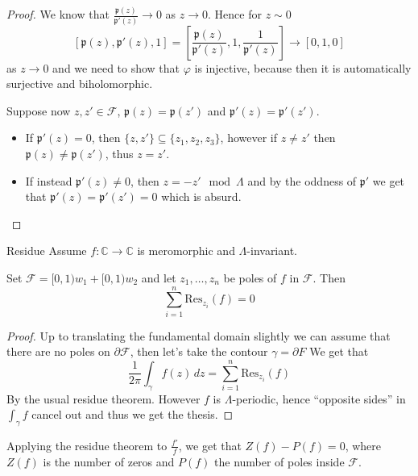 \begin{proof}{}
    We know that \(\frac{\mathfrak{p}{(z)}}{\mathfrak{p}'{(z)}} \to 0\) as \(z
    \to 0\). Hence for \(z \sim 0\) 
    \[
        \left[ \mathfrak{p}{(z)}, \mathfrak{p}'{(z)}, 1 \right] = \left[
        \frac{\mathfrak{p}{(z)}}{\mathfrak{p}'{(z)}}, 1,
    \frac{1}{\mathfrak{p}'{(z)}} \right] \to [0, 1, 0]
    \]
    as \(z \to 0\) 
    and we need to show that \(\varphi \) is injective, because then it is
    automatically surjective and biholomorphic. %

    Suppose now \(z, z' \in \mathcal{F}\), \(\mathfrak{p}{(z)} =
    \mathfrak{p}{(z')}\) and \(\mathfrak{p}'{(z)} = \mathfrak{p}'{(z')}\).
\begin{itemize}[label = --]
    \item If \(\mathfrak{p}'{(z)} = 0\), then \(\{z, z'\} \subseteq \{z_{1},
        z_{2}, z_{3}\}\), however if \(z \neq z'\) then \(\mathfrak{p}{(z)} \neq
        \mathfrak{p}{(z')}\), thus \(z = z'\).
    \item If instead \(\mathfrak{p}'{(z)} \neq 0\), then \(z = -z' \mod
        \Lambda\) and by the oddness of \(\mathfrak{p}'\) we get that
        \(\mathfrak{p}'{(z)} = \mathfrak{p}'{(z')} = 0\) which is absurd.
\end{itemize}


\end{proof}

\begin{theorem}{Residue}
    Assume \(f : \mathbb{C} \to \mathbb{C}\) is meromorphic and
    \(\Lambda\)-invariant. 

    Set \(\mathcal{F} = [0, 1)w_{1} + [0, 1)w_{2}\) and let \(z_{1}, \dots,
    z_{n}\) be poles of \(f\) in \(\mathcal{F}\). Then 
    \[
      \sum_{i=1}^{n} \mathrm{Res}_{z_{i}} {(f)} = 0
    \]
\end{theorem}

\begin{proof}{}
    Up to translating the fundamental domain slightly we can assume that there
    are no poles on \(\partial \mathcal{F}\), then let's take the contour
    \(\gamma = \partial F\) 
    We get that 
    \[
      \frac{1}{2\pi} \int_{\gamma} f{(z)}  \,dz = \sum_{i=1}^{n}
      \mathrm{Res}_{z_{i}} {(f)}  
    \]
    By the usual residue theorem. However \(f\) is \(\Lambda\)-periodic, hence
    ``opposite sides'' in \(\int _{\gamma} f\) cancel out and thus we get the
    thesis.
\end{proof}
\begin{remark}{}
    Applying the residue theorem to \(\frac{f'}{f}\), we get that \(Z{(f)} -
    P{(f)} = 0\), where \(Z{(f)}\) is the number of zeros and \(P{(f)}\) the
    number of poles inside \(\mathcal{F}\).
\end{remark}

